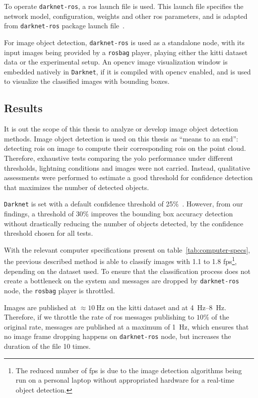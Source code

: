 To operate \texttt{darknet-ros}, a \ac{ros} launch file is used. This launch file specifies the network model, configuration, weights and other \ac{ros} parameters, and is adapted from \texttt{darknet-ros} package launch file~\cite{MarkoBjelonic}. 

For image object detection, \texttt{darknet-ros} is used as a standalone node, with its input images being provided by a \texttt{rosbag} player, playing either the \ac{kitti} dataset data or the experimental setup. An \ac{opencv} image visualization window is embedded natively in \texttt{Darknet}, if it is compiled with \ac{opencv} enabled, and is used to visualize the classified images with bounding boxes.


\subsection{Results}
\label{subsec:object-detection:image-results}
It is out the scope of this thesis to analyze or develop image object detection methods. Image object detection is used on this thesis as ``means to an end'': detecting \acp{roi} on image to compute their corresponding \acp{roi} on the point cloud. Therefore, exhaustive tests comparing the \ac{yolo} performance under different thresholds, lightning conditions and images were not carried. Instead, qualitative assessments were performed to estimate a good threshold for confidence detection that maximizes the number of detected objects.

\texttt{Darknet} is set with a default confidence threshold of 25\%~\cite{Redmon2016}. However, from our findings, a threshold of 30\% improves the bounding box accuracy detection without drastically reducing the number of objects detected, by the confidence threshold chosen for all tests.

With the relevant computer specifications present on table~\ref{tab:computer-specs}, the previous described method is able to classify images with 1.1 to 1.8 \ac{fps}\footnote{The reduced number of \ac{fps} is due to the image detection algorithms being run on a personal laptop without appropriated hardware for a real-time object detection.}, depending on the dataset used. To ensure that the classification process does not create a bottleneck on the system and messages are dropped by \texttt{darknet-ros} node, the \texttt{rosbag} player is throttled.

Images are published at $\approx\SI{10}{\hertz}$ on the \ac{kitti} dataset and at \SIrange[range-units=single]{4}{8}{\hertz}. Therefore, if we throttle the rate of \ac{ros} messages publishing to $10\%$ of the original rate, messages are published at a maximum of \SI{1}{\hertz}, which ensures that no image frame dropping happens on \texttt{darknet-ros} node, but increases the duration of the file 10 times.

